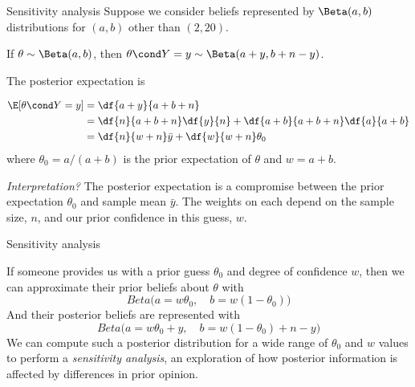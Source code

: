 \documentclass[10pt]{beamer}
\begin{document}
\begin{frame}{Sensitivity analysis}
Suppose we consider beliefs represented by $\Beta(a,b)$ distributions for $(a,b)$ other than $(2,20)$.  
 
\pause 
If $\theta \sim \Beta(a,b)$,  then $\theta \cond Y=y \sim \Beta(a+y,  b+n-y)$.  
\pause 

The posterior expectation is

\begin{align*}
\E[\theta \cond Y=y] &= \df{a+y}{a+b+n} \\
&= \df{n}{a+b+n} \df{y}{n} + \df{a+b}{a+b+n} \df{a}{a+b} \\
& = \df{n}{w+n}  \bar{y} + \df{w}{w+n} \theta_0 \\
\end{align*}
where $\theta_0 = a/(a+b)$ is the prior expectation of $\theta$ and $w=a+b$.
\pause 

\textit{Interpretation?} \pause The posterior expectation is a compromise between the prior expectation $\theta_0$ and sample mean $\bar{y}$.  The weights on each depend on the sample size,  $n$,  and our prior confidence in this guess,  $w$. 
\end{frame}

\begin{frame}{Sensitivity analysis}

If someone provides us with a prior guess $\theta_0$ and degree of confidence $w$,  then we can approximate their prior beliefs about $\theta$ with
\[ Beta \bigg(  a = w \theta_0 ,  \quad  b= w (1-\theta_0) \bigg) \]
And their posterior beliefs are represented with 
\[ Beta \bigg(  a = w \theta_0 + y  ,  \quad  b= w (1-\theta_0) + n-y \bigg) \] 
\pause 
We can compute such a posterior distribution for a wide range of $\theta_0$ and $w$ values to perform a \textit{sensitivity analysis},  an exploration of how posterior information is affected by differences in prior opinion.


\end{frame}
\end{document}

